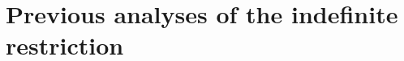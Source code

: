 \documentclass[
	letterpaper,
]{article}
\begin{document}
\section{Previous analyses of the indefinite restriction}\label{sec:LitReview}
%
\end{document}
